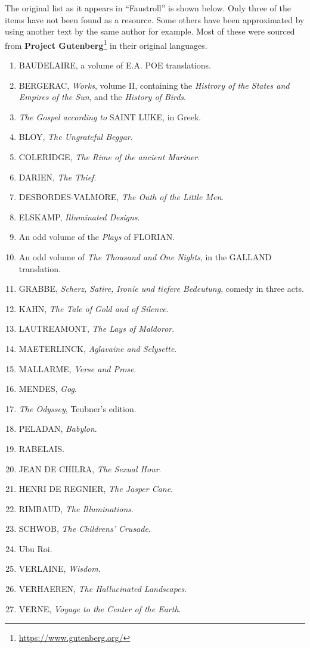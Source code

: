 The original list as it appears in ``Faustroll'' is shown below. Only three of the items have not been found as a resource. Some others have been approximated by using another text by the same author for example. Most of these were sourced from \textbf{Project Gutenberg}\footnote{\url{https://www.gutenberg.org/}} in their original languages.
\begin{enumerate}
\item BAUDELAIRE, a volume of E.A. POE translations.
\item BERGERAC, \emph{Works}, volume II, containing the \emph{Histrory of the States and Empires of the Sun}, and the \emph{History of Birds}.
\item \emph{The Gospel according to} SAINT LUKE, in Greek.
\item BLOY, \emph{The Ungrateful Beggar}.
\item COLERIDGE, \emph{The Rime of the ancient Mariner}.
\item DARIEN, \emph{The Thief}.
\item DESBORDES-VALMORE, \emph{The Oath of the Little Men}.
\item ELSKAMP, \emph{Illuminated Designs}.
\item An odd volume of the \emph{Plays} of FLORIAN\@.
\item An odd volume of \emph{The Thousand and One Nights}, in the GALLAND translation.
\item GRABBE, \emph{Scherz, Satire, Ironie und tiefere Bedeutung}, comedy in three acts.
\item KAHN, \emph{The Tale of Gold and of Silence}.
\item LAUTREAMONT, \emph{The Lays of Maldoror}.
\item MAETERLINCK, \emph{Aglavaine and Selysette}.
\item MALLARME, \emph{Verse and Prose}.
\item MENDES, \emph{Gog}.
\item \emph{The Odyssey}, Teubner's edition.
\item PELADAN, \emph{Babylon}.
\item RABELAIS\@.
\item JEAN DE CHILRA, \emph{The Sexual Hour}.
\item HENRI DE REGNIER, \emph{The Jasper Cane}.
\item RIMBAUD, \emph{The Illuminations}.
\item SCHWOB, \emph{The Childrens' Crusade}.
\item Ubu Roi.
\item VERLAINE, \emph{Wisdom}.
\item VERHAEREN, \emph{The Hallucinated Landscapes}.
\item VERNE, \emph{Voyage to the Center of the Earth}.
\end{enumerate}

